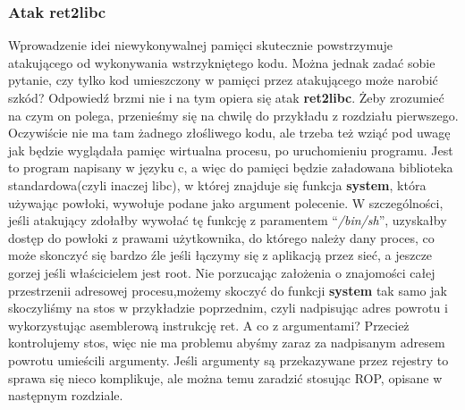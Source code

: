 \documentclass[polish]{kbk}
\begin{document}
\subsubsection{Atak ret2libc}
Wprowadzenie idei niewykonywalnej pamięci skutecznie powstrzymuje atakującego od wykonywania wstrzykniętego kodu. Można jednak zadać sobie pytanie, czy tylko kod umieszczony w pamięci przez atakującego może narobić szkód? Odpowiedź brzmi nie i na tym opiera się atak \textbf{ret2libc}. \newline
Żeby zrozumieć na czym on polega, przenieśmy się na chwilę do przykładu z rozdziału pierwszego.
Oczywiście nie ma tam żadnego złośliwego kodu, ale trzeba też wziąć pod uwagę jak będzie wyglądała pamięc wirtualna procesu, po uruchomieniu programu. Jest to program napisany w języku c, a więc do pamięci będzie załadowana biblioteka standardowa(czyli inaczej libc), w której znajduje się funkcja \textbf{system}, która używając powłoki, wywołuje podane jako argument polecenie. W szczególności, jeśli atakujący zdołałby wywołać tę funkcję z paramentem ``\textit{/bin/sh}'', uzyskałby dostęp do powłoki z prawami użytkownika, do którego należy dany proces, co może skonczyć się bardzo źle jeśli łączymy się z aplikacją przez sieć, a jeszcze gorzej jeśli właścicielem jest root.\newline
Nie porzucając założenia o znajomości całej przestrzenii adresowej procesu,możemy skoczyć do
 funkcji \textbf{system} tak samo jak skoczyliśmy na stos w przykładzie poprzednim, czyli nadpisując adres powrotu i wykorzystując asemblerową instrukcję ret. A co z argumentami? Przecież kontrolujemy stos, więc nie ma problemu abyśmy zaraz za nadpisanym adresem powrotu umieścili argumenty. Jeśli argumenty są przekazywane przez rejestry to sprawa się nieco komplikuje, ale można temu zaradzić stosując ROP, opisane w następnym rozdziale.
 
\end{document}
